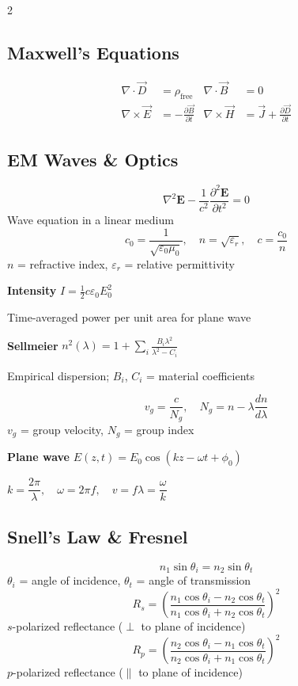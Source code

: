 \documentclass[9pt]{extarticle}
\newcommand{\eqlabel}[1]{\textbf{\scriptsize #1}\;}
\newcommand{\desc}[1]{{\small\color{desc}#1}}
\begin{document}
\begin{multicols}{2}
\subsection{Maxwell's Equations}
\begin{align*}
\nabla\cdot\vec{D} &= \rho_{\text{free}} & \nabla\cdot\vec{B} &= 0 \\
\nabla\times\vec{E} &= -\frac{\partial\vec{B}}{\partial t} & \nabla\times\vec{H} &= \vec{J} + \frac{\partial\vec{D}}{\partial t}
\end{align*}

\subsection{EM Waves \& Optics}
\[\nabla^2\mathbf{E} - \frac{1}{c^2}\frac{\partial^2\mathbf{E}}{\partial t^2} = 0\]
\desc{Wave equation in a linear medium}
\[c_0 = \frac{1}{\sqrt{\varepsilon_0\mu_0}},\quad n = \sqrt{\varepsilon_r},\quad c = \frac{c_0}{n}\]
\desc{$n$ = refractive index, $\varepsilon_r$ = relative permittivity}

\eqlabel{Intensity} $I = \tfrac{1}{2}c\varepsilon_0 E_0^2$

\desc{Time-averaged power per unit area for plane wave}

\eqlabel{Sellmeier} $n^2(\lambda) = 1 + \displaystyle\sum_i\frac{B_i\lambda^2}{\lambda^2 - C_i}$

\desc{Empirical dispersion; $B_i$, $C_i$ = material coefficients}

\[v_g = \frac{c}{N_g},\quad N_g = n - \lambda\frac{dn}{d\lambda}\]
\desc{$v_g$ = group velocity, $N_g$ = group index}

\eqlabel{Plane wave} $E(z,t) = E_0\cos(kz - \omega t + \phi_0)$

$k = \dfrac{2\pi}{\lambda},\quad \omega = 2\pi f,\quad v = f\lambda = \dfrac{\omega}{k}$

\subsection{Snell's Law \& Fresnel}
\[n_1\sin\theta_i = n_2\sin\theta_t\]
\desc{$\theta_i$ = angle of incidence, $\theta_t$ = angle of transmission}
\[R_s = \left(\frac{n_1\cos\theta_i - n_2\cos\theta_t}{n_1\cos\theta_i + n_2\cos\theta_t}\right)^{\!2}\]
\desc{$s$-polarized reflectance ($\perp$ to plane of incidence)}
\[R_p = \left(\frac{n_2\cos\theta_i - n_1\cos\theta_t}{n_2\cos\theta_i + n_1\cos\theta_t}\right)^{\!2}\]
\desc{$p$-polarized reflectance ($\parallel$ to plane of incidence)}


\end{multicols}
\end{document}
